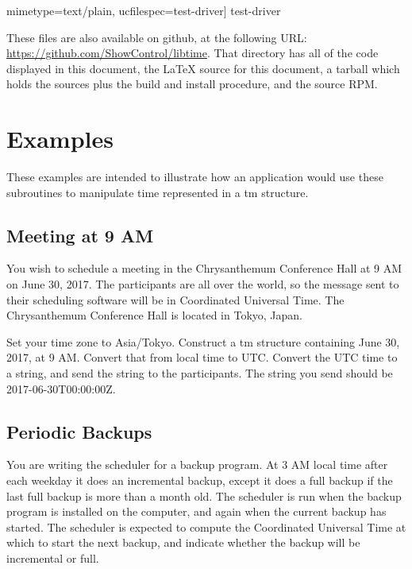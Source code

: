 \documentclass[letterpaper,twoside]{article}
\begin{document}
  mimetype={text/plain},
  ucfilespec={test-driver}]
          {test-driver}

These files are also available on github, at the following URL:
\href{https://github.com/ShowControl/libtime}{https://github.com/ShowControl/libtime}.
That directory has all of the code displayed in this document,
the {\LaTeX} source for this document,
a tarball which holds the sources plus the build and install procedure,
and the source RPM.

\section{Examples}
These examples are intended to illustrate how an application would
use these subroutines to manipulate time represented in a
{\ttfamily tm} structure.

\subsection{Meeting at 9 AM}
You wish to schedule a meeting in the Chrysanthemum Conference Hall
at 9 AM on June 30, 2017.  The participants are all over the world,
so the message sent to their scheduling software will be in
Coordinated Universal Time.  The Chrysanthemum Conference Hall
is located in Tokyo, Japan.

Set your time zone to Asia/Tokyo.  Construct a {\ttfamily tm} structure
containing June 30, 2017, at 9 AM.  Convert that from local time to UTC.
Convert the UTC time to a string, and send the string to
the participants.  The string you send should be 2017-06-30T00:00:00Z.

\subsection{Periodic Backups}
You are writing the scheduler for a backup program.  At 3 AM
local time
after each weekday it does an incremental backup,
except it does a full backup if the last full backup is more
than a month old.  The scheduler is run when the backup program
is installed on the computer, and again when
the current backup has started.  The scheduler is expected
to compute the Coordinated Universal Time at which to start
the next backup, and indicate whether the backup will be
incremental or full.
\end{document}
